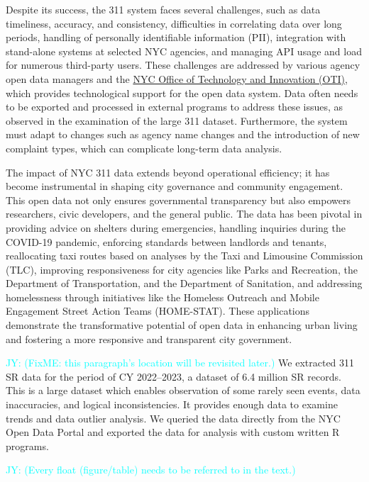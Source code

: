 \documentclass[12pt, titlepage]{article}
\newcommand{\jy}[1]{\textcolor{cyan}{JY: (#1)}}
\begin{document}
Despite its success, the 311 system faces several challenges, such as
data timeliness, accuracy, and consistency, difficulties in
correlating data over long periods, handling of personally
identifiable information (PII), integration with stand-alone systems
at selected NYC agencies, and managing API usage and load for numerous
third-party users. These challenges are addressed by various agency
open data managers and the
\href{https://www.nyc.gov/content/oti/pages/}{NYC Office of Technology
  and Innovation (OTI)}, which provides technological support for the
open data system. Data often needs to be exported and processed in
external programs to address these issues, as observed in the
examination of the large 311 dataset. Furthermore, the system must
adapt to changes such as agency name changes and the introduction of
new complaint types, which can complicate long-term data analysis.


The impact of NYC 311 data extends beyond operational efficiency; it
has become instrumental in shaping city governance and community
engagement. This open data not only ensures governmental transparency
but also empowers researchers, civic developers, and the general
public. The data has been pivotal in providing advice on shelters
during emergencies, handling inquiries during the COVID-19 pandemic,
enforcing standards between landlords and tenants, reallocating taxi
routes based on analyses by the Taxi and Limousine Commission (TLC),
improving responsiveness for city agencies like Parks and Recreation,
the Department of Transportation, and the Department of Sanitation,
and addressing homelessness through initiatives like the Homeless
Outreach and Mobile Engagement Street Action Teams (HOME-STAT). These
applications demonstrate the transformative potential of open data in
enhancing urban living and fostering a more responsive and transparent
city government.


\jy{FixME: this paragraph's location will be revisited later.}
We extracted 311 SR data for the period of CY 2022--2023, a dataset of
6.4 million SR records. This is a large dataset which enables 
observation of some rarely seen events, data inaccuracies, 
and logical inconsistencies. It provides enough data to 
examine trends and data outlier analysis. We queried the data 
directly from the NYC Open Data Portal and exported the 
data for analysis with custom written R programs.




\jy{Every float (figure/table) needs to be referred to in the text.}
\end{document}
